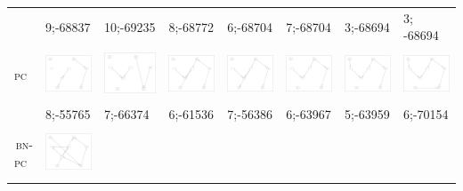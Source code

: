 \begin{table}[!p]
\begin{tabular}{r@{}p{2.0cm}@{}p{2.0cm}@{}p{2.0cm}@{}p{2.0cm}@{}p{2.0cm}@{}p{2.0cm}@{}p{2.0cm}}
& 9;-68837 & 10;-69235 & 8;-68772 & 6;-68704 & 7;-68704 & 3;-68694 & 3; -68694 \\
\textsc{pc~} &
\includegraphics[width=20.3mm, height=14.25mm]{fig/11-Sep-2003-14-27-53-dag-asia250-PC-RES} &
\includegraphics[width=20.3mm, height=14.25mm]{fig/11-Aug-2003-14-06-42-dag-asia500-GES-RES} &
\includegraphics[width=20.3mm, height=14.25mm]{fig/11-Aug-2003-14-06-42-dag-asia1000-GES-RES} &
\includegraphics[width=20.3mm, height=14.25mm]{fig/11-Aug-2003-14-06-42-dag-asia2000-GES-RES} &
\includegraphics[width=20.3mm, height=14.25mm]{fig/11-Aug-2003-14-06-42-dag-asia5000-GES-RES} &
\includegraphics[width=20.3mm, height=14.25mm]{fig/11-Aug-2003-14-06-42-dag-asia10000-GES-RES} &
\includegraphics[width=20.3mm, height=14.25mm]{fig/11-Aug-2003-14-06-42-dag-asia15000-GES-RES} \\
& 8;-55765 & 7;-66374 & 6;-61536 & 7;-56386 & 6;-63967 & 5;-63959 & 6;-70154\\
\textsc{bn-pc~} &
\includegraphics[width=20.3mm, height=14.25mm]{fig/11-Sep-2003-14-37-15-dag-asia250-BNPC-RES} &

\end{tabular}
\end{table}
